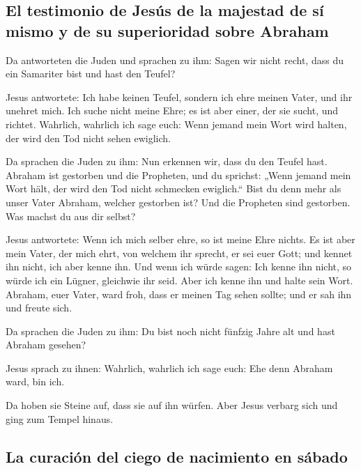 \hypertarget{el-testimonio-de-jesuxfas-de-la-majestad-de-suxed-mismo-y-de-su-superioridad-sobre-abraham}{%
\subsection{El testimonio de Jesús de la majestad de sí mismo y de su
superioridad sobre
Abraham}\label{el-testimonio-de-jesuxfas-de-la-majestad-de-suxed-mismo-y-de-su-superioridad-sobre-abraham}}

 Da antworteten die Juden und sprachen zu ihm: Sagen wir
nicht recht, dass du ein Samariter bist und hast den Teufel?

 Jesus antwortete: Ich habe keinen Teufel, sondern ich
ehre meinen Vater, und ihr unehret mich.  Ich suche nicht
meine Ehre; es ist aber einer, der sie sucht, und richtet.
 Wahrlich, wahrlich ich sage euch: Wenn jemand mein Wort
wird halten, der wird den Tod nicht sehen ewiglich.

 Da sprachen die Juden zu ihm: Nun erkennen wir, dass du
den Teufel hast. Abraham ist gestorben und die Propheten, und du
sprichst: „Wenn jemand mein Wort hält, der wird den Tod nicht schmecken
ewiglich.``  Bist du denn mehr als unser Vater Abraham,
welcher gestorben ist? Und die Propheten sind gestorben. Was machst du
aus dir selbst?

 Jesus antwortete: Wenn ich mich selber ehre, so ist
meine Ehre nichts. Es ist aber mein Vater, der mich ehrt, von welchem
ihr sprecht, er sei euer Gott;  und kennet ihn nicht, ich
aber kenne ihn. Und wenn ich würde sagen: Ich kenne ihn nicht, so würde
ich ein Lügner, gleichwie ihr seid. Aber ich kenne ihn und halte sein
Wort.  Abraham, euer Vater, ward froh, dass er meinen Tag
sehen sollte; und er sah ihn und freute sich.

 Da sprachen die Juden zu ihm: Du bist noch nicht fünfzig
Jahre alt und hast Abraham gesehen?

 Jesus sprach zu ihnen: Wahrlich, wahrlich ich sage euch:
Ehe denn Abraham ward, bin ich.

 Da hoben sie Steine auf, dass sie auf ihn würfen. Aber
Jesus verbarg sich und ging zum Tempel hinaus.

\hypertarget{la-curaciuxf3n-del-ciego-de-nacimiento-en-suxe1bado}{%
\subsection{La curación del ciego de nacimiento en
sábado}\label{la-curaciuxf3n-del-ciego-de-nacimiento-en-suxe1bado}}

